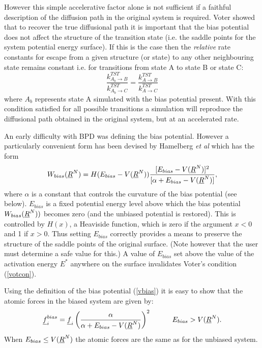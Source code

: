 However this simple accelerative factor alone is not sufficient if a
faithful description of the diffusion path in the original system is
required. Voter \cite{voter-97a} showed that to recover the true
diffusional path it is important that the bias potential does not
affect the structure of the transition state (i.e. the saddle points
for the system potential energy surface). If this is the case
then the {\em relative} rate constants for escape from a given structure (or
state) to any other neighbouring state remains constant i.e. for
transitions from state A to state B or state C:
\begin{equation}
\frac{k^{TST}_{A_{b}\rightarrow B}}{k^{TST}_{A_{b}\rightarrow C}}=
\frac{k^{TST}_{A\rightarrow B}}{k^{TST}_{A\rightarrow C}} \label{votcon}
\end{equation}
where $A_{b}$ represents state A simulated with the bias potential
present.  With this condition satisfied for all possible transitions a
simulation will reproduce the diffusional path obtained in the
original system, but at an accelerated rate.

An early difficulty with BPD was defining the bias potential. However
a particularly convenient form has been devised by Hamelberg {\em et
al} \cite{hamelberg-04a} which has the form
\begin{equation}
W_{bias}(\mbox{$\underline{R}$}^{N})=H(E_{bias}-V(\mbox{$\underline{R}$}^{N}))
\frac{[E_{bias}-V(\mbox{$\underline{R}$}^{N})]^{2}}
{[\alpha+E_{bias}-V(\mbox{$\underline{R}$}^{N})]}, \label{vbias}
\end{equation}
where $\alpha$ is a constant that controls the curvature of
the bias potential (see below). $E_{bias}$ is a fixed potential energy
level above which the bias potential $W_{bias}(\mbox{$\underline{R}$}^{N}))$ becomes
zero (and the unbiased potential is restored). This is controlled by
$H(x)$, a Heaviside function, which is zero if the argument $x<0$ and
1 if $x>0$. Thus setting $E_{bias}$ correctly provides a means to
preserve the structure of the saddle points of the original
surface. (Note however that the user must determine a safe value for
this.) A value of $E_{bias}$ set above the value of the activation
energy $E^{*}$ anywhere on the surface invalidates Voter's condition
(\ref{votcon}).

Using the definition of the bias potential (\ref{vbias}) it is easy to
show that the atomic forces in the biased system are given by:
\begin{equation}
\mbox{$\underline{f}$}_{i}^{bias}=\mbox{$\underline{f}$}_{i}\left 
(\frac{\alpha}{\alpha+E_{bias}-V(\mbox{$\underline{R}$}^{N})}\right )^{2}~~~~~~~~~E_{bias}>V(\mbox{$\underline{R}$}^{N}).
\end{equation}
When $E_{bias}\le V(\mbox{$\underline{R}$}^{N})$ the atomic forces are the same as
for the unbiased system.

